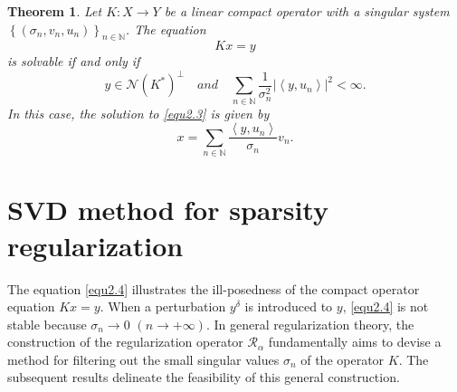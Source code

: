 \documentclass[a4paper,12pt]{article}
\newtheorem{theorem}{Theorem}[section]
\numberwithin{equation}{section}
\begin{document}
\begin{theorem}\label{the2.7}
    Let $K:X\rightarrow Y$ be a linear compact operator with a singular system $\left\{\left(\sigma_{n},v_{n},u_{n}\right)\right\}_{n\in\mathbb{N}}$. The equation 
    \begin{equation}\label{equ2.3}
        Kx=y
    \end{equation}
    is solvable if and only if 
    \begin{equation*}
        y\in\mathcal{N}(K^{*})^{\bot}\quad and \quad \sum_{n\in\mathbb{N}}\frac{1}{\sigma_{n}^{2}}|\left<y,u_{n}\right>|^{2}<\infty.
    \end{equation*}
    In this case, the solution to \eqref{equ2.3} is given by
    \begin{equation}\label{equ2.4}
        x=\sum_{n\in\mathbb{N}}\frac{\left<y,u_{n}\right>}{\sigma_{n}}v_{n}.
    \end{equation}
\end{theorem}

\section{SVD method for sparsity regularization}\label{sec3}

\par The equation \eqref{equ2.4} illustrates the ill-posedness of the compact operator equation $Kx=y$. When a perturbation $y^{\delta}$ is introduced to $y$, \eqref{equ2.4} is not stable because $\sigma_{n}\rightarrow 0$ $\left(n\rightarrow +\infty\right)$. In general regularization theory, the construction of the regularization operator $\mathcal{R}_{\alpha}$ fundamentally aims to devise a method for filtering out the small singular values $\sigma_{n}$ of the operator $K$. The subsequent results delineate the feasibility of this general construction.
\end{document}
